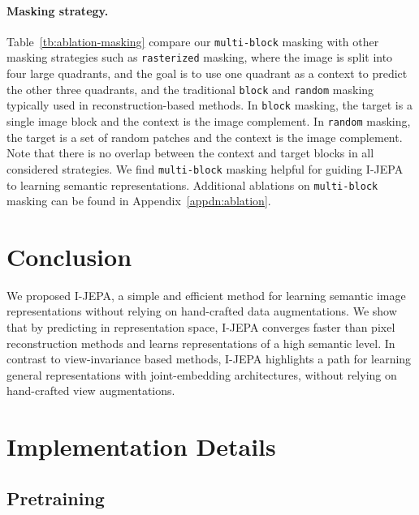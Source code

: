 \documentclass[10pt,twocolumn,letterpaper]{article}
\newcommand{\putalg}{{I-JEPA}\xspace}
\begin{document}
\paragraph{Masking strategy.}

Table~\ref{tb:ablation-masking} compare our {\tt multi-block} masking with other masking strategies
such as {\tt rasterized} masking, where the image is split into four large quadrants, and the goal is to use one quadrant as a context to predict the other three quadrants,
and the  traditional {\tt block} and {\tt random} masking typically used in reconstruction-based methods.
In {\tt block} masking, the target is a single image block and the context is the image complement.
In {\tt random} masking, the target is a set of random patches and the context is the image complement.
Note that there is no overlap between the context and target blocks in all considered strategies.
We find {\tt multi-block} masking helpful for guiding \putalg to learning semantic representations.
Additional ablations on {\tt multi-block} masking can be found in Appendix~\ref{appdn:ablation}.

\section{Conclusion}
\label{sec:conclusion}
We proposed \putalg, a simple and efficient method for learning semantic image representations without relying on hand-crafted data augmentations.
We show that by predicting in representation space, \putalg converges faster than pixel reconstruction methods and learns representations of a high semantic level.
In contrast to view-invariance based methods, \putalg highlights a path for learning general representations with joint-embedding architectures, without relying on hand-crafted view augmentations.

{\small

}
\vfill
\clearpage
\onecolumn

\appendix

\section{Implementation Details}
\label{app:implementation_details}

\subsection{Pretraining}
\end{document}
